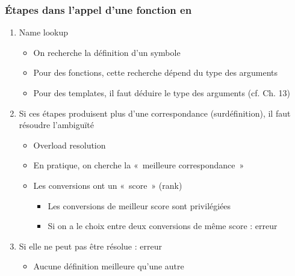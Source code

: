 \begin{frame}
\frametitle{Étapes dans l'appel d'une fonction en \cpp}
\begin{enumerate}[<+->]
\item Name lookup
	\begin{itemize}
	\item On recherche la définition d'un symbole
	\item Pour des fonctions, cette recherche dépend du type des arguments
	\item Pour des templates, il faut déduire le type des arguments (cf. Ch. 13)
	\end{itemize}
\item Si ces étapes produisent plus d'une correspondance (surdéfinition), il faut résoudre l'ambiguïté
	\begin{itemize}
	\item Overload resolution
	\item En pratique, on cherche la «~meilleure correspondance~»
	\item Les conversions ont un «~score~» (rank)
		\begin{itemize}
		\item Les conversions de meilleur score sont privilégiées
		\item Si on a le choix entre deux conversions de même score : erreur
		\end{itemize}
	\end{itemize}
\item Si elle ne peut pas être résolue : erreur
	\begin{itemize}
	\item Aucune définition meilleure qu'une autre
	\end{itemize}
\end{enumerate}
\end{frame}

